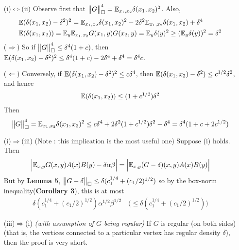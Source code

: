 \documentclass[10pt,a4paper]{report}
\newenvironment{proof}
{\begin{changemargin}{1cm}{0.5cm}
	}%
	{\end{changemargin}
}
\begin{document}
\begin{proof}
\pf \begin{itemize}
\item[(i)$\Leftrightarrow$(ii)] Observe first that $\bigl\lVert G\bigr\rVert_{\tiny{\square}}^4 = \mathbb{E}_{x_1,x_2} \delta(x_1,x_2)^2$. Also,
\begin{align*}
& \mathbb{E}(\delta(x_1,x_2)-\delta^2)^2 = \mathbb{E}_{x_1,x_2} \delta(x_1,x_2)^2 - 2\delta^2 \mathbb{E}_{x_1,x_2} \delta(x_1,x_2) + \delta^4 \\
& \mathbb{E}(\delta(x_1,x_2)) = \mathbb{E}_y \mathbb{E}_{x_1,x_2} G(x_1,y) G(x_2,y) = \mathbb{E}_y \delta(y)^2 \geq (\mathbb{E}_y \delta(y))^2 = \delta^2
\end{align*}
($\Rightarrow$) So if $\bigl\lVert G\bigr\rVert_{\tiny{\square}}^4 \leq \delta^4 (1+c)$, then $\mathbb{E}(\delta(x_1,x_2)-\delta^2)^2 \leq \delta^4 (1+c) -2\delta^4 + \delta^4 = \delta^4 c$.
\s

($\Leftarrow$) Conversely, if $\mathbb{E}(\delta(x_1,x_2)-\delta^2)^2 \leq c\delta^4$, then $\mathbb{E}(\delta(x_1,x_2)-\delta^2) \leq c^{1/2} \delta^2$, and hence
\begin{align*}
\mathbb{E}(\delta(x_1,x_2)) \leq (1+ c^{1/2}) \delta^2
\end{align*}
Then 
\begin{align*}
\bigl\lVert G\bigr\rVert_{\tiny{\square}}^4 = \mathbb{E}_{x_1,x_2} \delta(x_1,x_2)^2 \leq c\delta^4 + 2\delta^2(1+c^{1/2}) \delta^2 - \delta^4 = \delta^4(1+c+2c^{1/2})
\end{align*}
\item[(i)$\Rightarrow$(iii)] (Note : this implication is the most useful one) Suppose (i) holds. Then
\begin{align*}
\Big| \mathbb{E}_{x,y} G(x,y)A(x)B(y) - \delta \alpha \beta \Big| = \Big| \mathbb{E}_{x,y} (G-\delta)(x,y) A(x)B(y)   \Big|
\end{align*}
But by \textbf{Lemma 5}, $\bigl\lVert G-\delta\bigr\rVert_{\tiny{\square}} \leq \delta (c_1^{1/4} + (c_1/2)^{1/2})$ so by the box-norm inequality(\textbf{Corollary 3}), this is at most
\begin{align*}
\delta (c_1^{1/4} + (c_1/2)^{1/2}) \alpha^{1/2} \beta^{1/2} \quad \Big( \leq \delta(c_1^{1/4} + (c_1/2)^{1/2}) \Big)
\end{align*}
\item[(iii)$\Rightarrow$(i)] \emph{(with assumption of $G$ being regular)} If $G$ is regular (on both sides) (that is, the vertices connected to a particular vertex has regular density $\delta$), then the proof is very short.


\end{itemize}
\end{proof}
\end{document}
